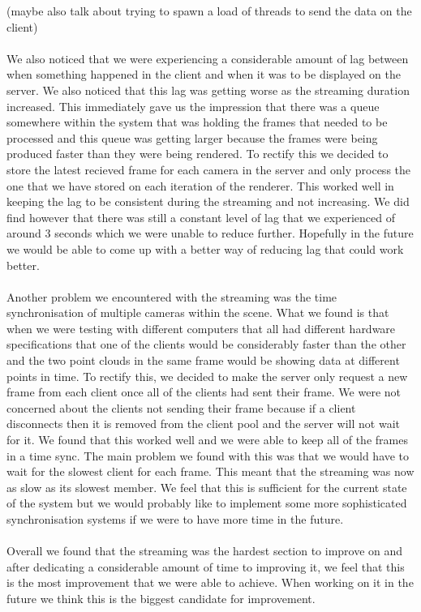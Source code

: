 \documentclass{article}
\begin{document}
(maybe also talk about trying to spawn a load of threads to send the data on the client)
\\\\
We also noticed that we were experiencing a considerable amount of lag between when something happened in the client and when it was to be displayed on the server. We also noticed that this lag was getting worse as the streaming duration increased. This immediately gave us the impression that there was a queue somewhere within the system that was holding the frames that needed to be processed and this queue was getting larger because the frames were being produced faster than they were being rendered. To rectify this we decided to store the latest recieved frame for each camera in the server and only process the one that we have stored on each iteration of the renderer. This worked well in keeping the lag to be consistent during the streaming and not increasing. We did find however that there was still a constant level of lag that we experienced of around 3 seconds which we were unable to reduce further. Hopefully in the future we would be able to come up with a better way of reducing lag that could work better.
\\\\
Another problem we encountered with the streaming was the time synchronisation of multiple cameras within the scene. What we found is that when we were testing with different computers that all had different hardware specifications that one of the clients would be considerably faster than the other and the two point clouds in the same frame would be showing data at different points in time. To rectify this, we decided to make the server only request a new frame from each client once all of the clients had sent their frame. We were not concerned about the clients not sending their frame because if a client disconnects then it is removed from the client pool and the server will not wait for it. We found that this worked well and we were able to keep all of the frames in a time sync. The main problem we found with this was that we would have to wait for the slowest client for each frame. This meant that the streaming was now as slow as its slowest member. We feel that this is sufficient for the current state of the system but we would probably like to implement some more sophisticated synchronisation systems if we were to have more time in the future.
\\\\
Overall we found that the streaming was the hardest section to improve on and after dedicating a considerable amount of time to improving it, we feel that this is the most improvement that we were able to achieve. When working on it in the future we think this is the biggest candidate for improvement.
\newpage
\end{document}
